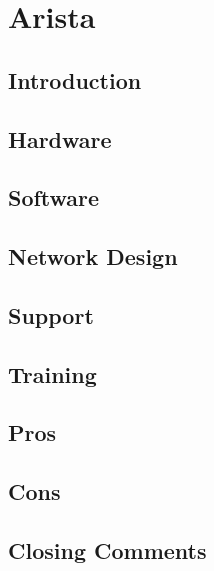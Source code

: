 \section{Arista}

\subsection{Introduction}
\subsection{Hardware}
\subsection{Software}
\subsection{Network Design}
\subsection{Support}
\subsection{Training}
\subsection{Pros}
\subsection{Cons}
\subsection{Closing Comments}